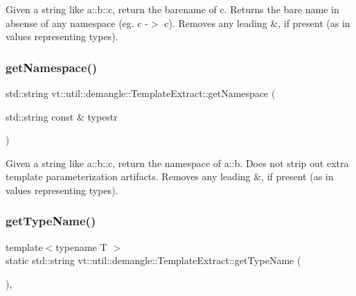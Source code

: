 Given a string like \textquotesingle{}a\+::b\+::c\textquotesingle{}, return the barename of \textquotesingle{}c\textquotesingle{}. Returns the bare name in absense of any namespace (eg. \textquotesingle{}c\textquotesingle{} -\/$>$ \textquotesingle{}c\textquotesingle{}). Removes any leading \textquotesingle{}\&\textquotesingle{}, if present (as in \textquotesingle{}values representing types\textquotesingle{}). \mbox{\label{structvt_1_1util_1_1demangle_1_1_template_extract_a5e896032f040eedc15e6e6b1397a6bfc}} 
\subsubsection{\texorpdfstring{get\+Namespace()}{getNamespace()}}
{\footnotesize\ttfamily std\+::string vt\+::util\+::demangle\+::\+Template\+Extract\+::get\+Namespace (\begin{DoxyParamCaption}\item[{std\+::string const \&}]{typestr }\end{DoxyParamCaption})\hspace{0.3cm}{\ttfamily [static]}}

Given a string like \textquotesingle{}a\+::b\+::c\textquotesingle{}, return the namespace of \textquotesingle{}a\+::b\textquotesingle{}. Does not strip out extra template parameterization artifacts. Removes any leading \textquotesingle{}\&\textquotesingle{}, if present (as in \textquotesingle{}values representing types\textquotesingle{}). \mbox{\label{structvt_1_1util_1_1demangle_1_1_template_extract_a78ecb83a83712ee88bbeacfb49cbf538}} 
\subsubsection{\texorpdfstring{get\+Type\+Name()}{getTypeName()}}
{\footnotesize\ttfamily template$<$typename T $>$ \\
static std\+::string vt\+::util\+::demangle\+::\+Template\+Extract\+::get\+Type\+Name (\begin{DoxyParamCaption}{ }\end{DoxyParamCaption})\hspace{0.3cm}{\ttfamily [inline]}, {\ttfamily [static]}}


